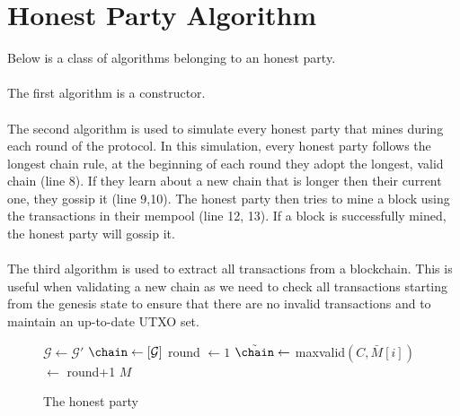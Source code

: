 \section{Honest Party Algorithm}
Below is a class of algorithms belonging to an honest party.
\\
\\
The first algorithm is a constructor.
\\
\\
The second algorithm is used to simulate every honest party that mines during each round of the protocol. In this simulation, every honest party follows the longest chain rule, at the beginning of each round they adopt the longest, valid chain (line 8). If they learn about a new chain that is longer then their current one, they gossip it (line 9,10). The honest party then tries to mine a block using the transactions in their mempool (line 12, 13). If a block is successfully mined, the honest party will gossip it.
\\
\\
The third algorithm is used to extract all transactions from a blockchain. This is useful when validating a new chain as we need to check all transactions starting from the genesis state to ensure that there are no invalid transactions and to maintain an up-to-date UTXO set.
\begin{figure}[H]
\begin{algorithm}[H]
    \caption{\label{alg.backbone} The honest party}
    \begin{algorithmic}[1]
     \Statex
     \Let{\chain}{[\,]}
            \State $\mathcal{G} \leftarrow \mathcal{G}'$ 
            \State $\chain \leftarrow [\mathcal{G}]$ 
            \State \textsf{round} $\leftarrow 1$
        \EndFunction
            \State $\tilde\chain \leftarrow$ maxvalid$(C, \bar M[i])$ 
            \If{$\tilde\chain \neq \chain$}
                \Let{\chain}{\tilde\chain}
            \EndIf
             
             
                 
            \EndIf
             $\leftarrow$ {\textsf{round}+1}
            \State\Return$M$
        \EndFunction
             
                 
            \EndFor
            \State{}
        \EndFunction
        \vskip8pt
    \end{algorithmic}
\end{algorithm}
\end{figure}


